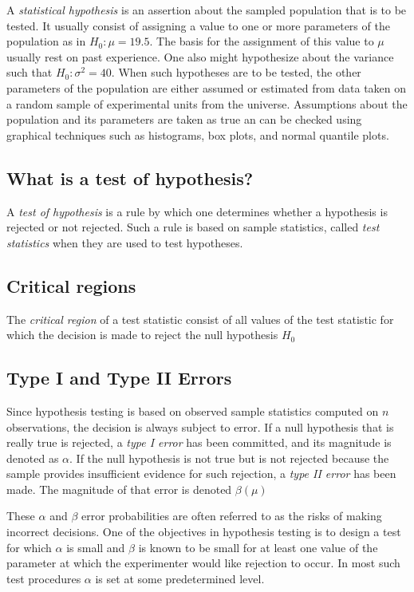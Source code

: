 \documentclass{WileySev}
\begin{document}
A \textit{statistical hypothesis} is an assertion about the sampled population that is to be tested. It usually consist of assigning a value to one or more parameters of the population as in $H_0:\mu = 19.5$. The basis for the assignment of this value to $\mu$ usually rest on past experience. One also might hypothesize about the variance such that $H_0: \sigma^2 = 40$. When such hypotheses are to be tested, the other parameters of the population are either assumed or estimated from data taken on a random sample of experimental units from the universe. Assumptions about the population and its parameters are taken as true an can be checked using graphical techniques such as histograms, box plots, and normal quantile plots.

\subsection{What is a test of hypothesis?}

A \textit{test of hypothesis} is a rule by which one determines whether a hypothesis is rejected or not rejected. Such a rule is based on sample statistics, called \textit{test statistics} when they are used to test hypotheses.

\subsection{Critical regions}

The \textit{critical region} of a test statistic consist of all values of the test statistic for which the decision is made to reject the null hypothesis $H_0$

\subsection{Type I and Type II Errors}

Since hypothesis testing is based on observed sample statistics computed on $n$ observations, the decision is always subject to error. If a null hypothesis that is really true is rejected, a \textit{type I error} has been committed, and its magnitude is denoted as $\alpha$. If the null hypothesis is not true but is not rejected because the sample provides insufficient evidence for such rejection, a \textit{type II error} has been made. The magnitude of that error is denoted $\beta(\mu)$

These $\alpha$ and $\beta$ error probabilities are often referred to as the risks of making incorrect decisions. One of the objectives in hypothesis testing is to design a test for which $\alpha$ is small and $\beta$ is known to be small for at least one value of the parameter at which the experimenter would like rejection to occur. In most such test procedures $\alpha$ is set at some predetermined level.
\end{document}
